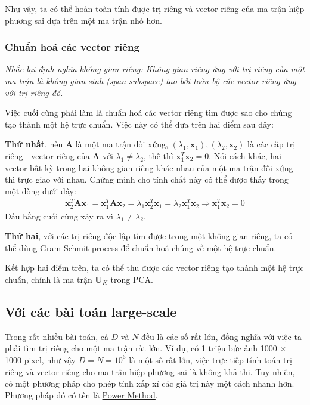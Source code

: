 Như vậy, ta có thể hoàn toàn tính được trị riêng và vector riêng của ma trận hiệp phương sai dựa trên một ma trận nhỏ hơn. 
 
 
\subsubsection{Chuẩn hoá các vector riêng}
 
\textit{Nhắc lại định nghĩa không gian riêng: Không gian riêng ứng với trị riêng của một ma trận là không gian sinh (span subspace) tạo bởi toàn bộ các vector riêng ứng với trị riêng đó.} 
 
Việc cuối cùng phải làm là chuẩn hoá các vector riêng tìm được sao cho chúng tạo thành một hệ trực chuẩn. Việc này có thể dựa trên hai điểm sau đây: 
 
\textbf{Thứ nhất}, nếu $\mathbf{A}$ là một ma trận đối xứng, $(\lambda_1, \mathbf{x}_1), (\lambda_2, \mathbf{x}_2)$ là các căp trị riêng - vector riêng của $\mathbf{A}$ với $\lambda_1 \neq \lambda_2$, thế thì $\mathbf{x}_1^T\mathbf{x}_2 = 0$. Nói cách khác, hai vector bất kỳ trong hai không gian riêng khác nhau của một ma trận đối xứng thì trực giao với nhau. Chứng minh cho tính chất này có thể được thấy trong một dòng dưới đây: 
\begin{eqnarray} 
  \mathbf{x}_2^T \mathbf{Ax}_1 = \mathbf{x}_1^T \mathbf{Ax}_2 = \lambda_1 \mathbf{x}_2^T \mathbf{x}_1 = \lambda_2 \mathbf{x}_1^T \mathbf{x}_2 \Rightarrow \mathbf{x}_1^T \mathbf{x}_2 = 0 
\end{eqnarray} 
Dấu bằng cuối cùng xảy ra vì $\lambda_1 \neq \lambda_2$. 
 
\textbf{Thứ hai}, với các trị riêng độc lập tìm được trong một không gian riêng, ta có thể dùng Gram-Schmit process để chuẩn hoá chúng về một hệ trực chuẩn. 
 
Kết hợp hai điểm trên, ta có thể thu được các vector riêng tạo thành một hệ trực chuẩn, chính là ma trận $\mathbf{U}_K$ trong PCA. 
 
 
\subsection{Với các bài toán large-scale}
Trong rất nhiều bài toán, cả $D$ và $N$ đều là các số rất lớn, đồng nghĩa với việc ta phải tìm trị riêng cho một ma trận rất lớn. Ví dụ, có 1 triệu bức ảnh 1000 $\times$ 1000 pixel, như vậy $D = N = 10^6$ là một số rất lớn, việc trực tiếp tính toán trị riêng và vector riêng cho ma trận hiệp phương sai là không khả thi. Tuy nhiên, có một phương pháp cho phép tính xấp xỉ các giá trị này một cách nhanh hơn. Phương pháp đó có tên là \href{http://www.cs.huji.ac.il/~csip/tirgul2.pdf}{Power Method}. 
 
